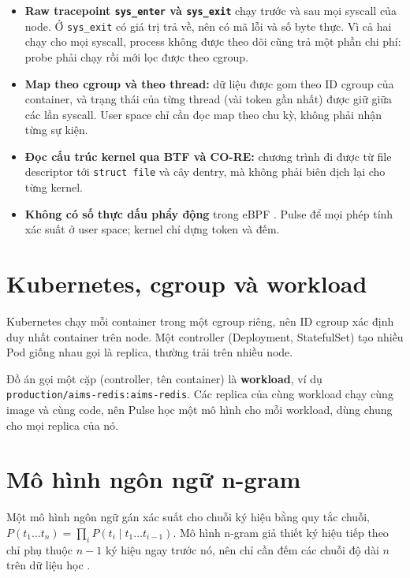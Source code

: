 \begin{itemize}
\tightlist
\item
  \textbf{Raw tracepoint \texttt{sys\_\allowbreak{}enter} và \texttt{sys\_\allowbreak{}exit}} chạy trước và sau mọi syscall của node. Ở \texttt{sys\_exit} có giá trị trả về, nên có mã lỗi và số byte thực. Vì cả hai chạy cho mọi syscall, process không được theo dõi cũng trả một phần chi phí: probe phải chạy rồi mới lọc được theo cgroup.
\item
  \textbf{Map theo cgroup và theo thread:} dữ liệu được gom theo ID cgroup của container, và trạng thái của từng thread (vài token gần nhất) được giữ giữa các lần syscall. User space chỉ cần đọc map theo chu kỳ, không phải nhận từng sự kiện.
\item
  \textbf{Đọc cấu trúc kernel qua BTF và CO-RE:} chương trình đi được từ file descriptor tới \texttt{struct file} và cây dentry, mà không phải biên dịch lại cho từng kernel.
\item
  \textbf{Không có số thực dấu phẩy động} trong eBPF \citep{osaki2024}. Pulse để mọi phép tính xác suất ở user space; kernel chỉ dựng token và đếm.
\end{itemize}

\section{Kubernetes, cgroup và workload}

Kubernetes chạy mỗi container trong một cgroup riêng, nên ID cgroup xác định duy nhất container trên node. Một controller (Deployment, StatefulSet) tạo nhiều Pod giống nhau gọi là replica, thường trải trên nhiều node.

Đồ án gọi một cặp (controller, tên container) là \textbf{workload}, ví dụ \texttt{production/\allowbreak{}aims-\allowbreak{}redis:aims-\allowbreak{}redis}. Các replica của cùng workload chạy cùng image và cùng code, nên Pulse học một mô hình cho mỗi workload, dùng chung cho mọi replica của nó.

\section{Mô hình ngôn ngữ n-gram}

Một mô hình ngôn ngữ gán xác suất cho chuỗi ký hiệu bằng quy tắc chuỗi, $P(t_1 \ldots t_n) = \prod_i P(t_i \mid t_1 \ldots t_{i-1})$. Mô hình n-gram giả thiết ký hiệu tiếp theo chỉ phụ thuộc $n-1$ ký hiệu ngay trước nó, nên chỉ cần đếm các chuỗi độ dài $n$ trên dữ liệu học \citep{chen1999}.

